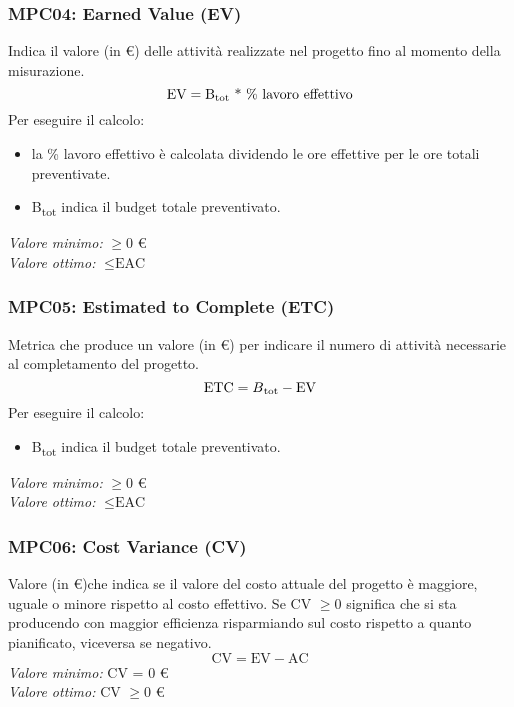 \subsubsection{MPC04: Earned Value (EV)}
Indica il valore (in \euro) delle attività realizzate nel progetto fino al momento della misurazione.
\begin{equation*}
\text{EV}=\text{B\textsubscript{tot} * \%\text{ lavoro effettivo}}
\end{equation*}
\noindent Per eseguire il calcolo:
 \begin{itemize}
 \item la \% lavoro effettivo è calcolata dividendo le ore effettive per le ore totali preventivate.
 \item B\textsubscript{tot} indica il budget totale preventivato.
 \end{itemize}
\textit{Valore minimo:} $\ge 0$ \euro\\
\textit{Valore ottimo:} $\le \text{EAC}$
\subsubsection{MPC05: Estimated to Complete (ETC)}
Metrica che produce un valore (in \euro) per indicare il numero di attività necessarie al completamento del progetto.\\
\begin{equation*}
 \text{ETC}=B\textsubscript{tot}-\text{EV}
 \end{equation*}
 \noindent Per eseguire il calcolo:
 \begin{itemize}
 \item B\textsubscript{tot} indica il budget totale preventivato.
 \end{itemize}
\textit{Valore minimo:} $\ge 0$ \euro\\
\textit{Valore ottimo:} $\le \text{EAC}$
\subsubsection{MPC06: Cost Variance (CV)}
Valore (in \euro)che indica se il valore del costo attuale del progetto è maggiore, uguale o minore rispetto al costo effettivo. Se CV $\ge 0$ significa che si sta producendo con maggior efficienza risparmiando sul costo rispetto a quanto pianificato, viceversa se negativo.
\begin{equation*}
\text{CV}=\text{EV}-\text{AC}
\end{equation*}
\textit{Valore minimo:} CV = 0 \euro\\
\textit{Valore ottimo:} CV $\ge 0$ \euro
